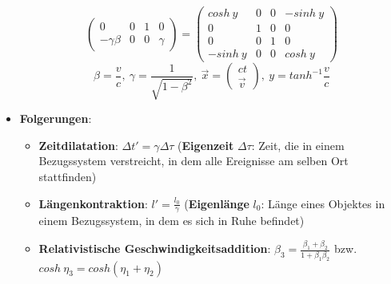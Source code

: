 \begin{itemize}
$$\begin{pmatrix}
			0 & 0 & 1 & 0\\
			-\gamma\beta & 0 & 0 & \gamma
		\end{pmatrix}
		=
		\begin{pmatrix}
			cosh\ y & 0 & 0 & -sinh\ y\\
			0 & 1 & 0 & 0\\
			0 & 0 & 1 & 0\\
			-sinh\ y & 0 & 0 & cosh\ y
		\end{pmatrix}
	$$
	$$
			\beta = \frac{v}{c},\ \gamma = \frac{1}{\sqrt{1 - \beta^2}},\ \vec{x} = \begin{pmatrix}ct\\\vec{v}\end{pmatrix},\ y = tanh^{-1}\frac{v}{c}
	$$
	\item \textbf{Folgerungen}:
	\begin{itemize}
		\item \textbf{Zeitdilatation}: $\Delta t' = \gamma\Delta\tau$ (\textbf{Eigenzeit} $\Delta\tau$: Zeit, die in einem Bezugssystem verstreicht, in dem alle Ereignisse am selben Ort stattfinden)
		\item \textbf{Längenkontraktion}: $l' = \frac{l_0}{\gamma}$ (\textbf{Eigenlänge} $l_0$: Länge eines Objektes in einem Bezugssystem, in dem es sich in Ruhe befindet)
		\item \textbf{Relativistische Geschwindigkeitsaddition}: $\beta_3 = \frac{\beta_1 + \beta_2}{1 + \beta_1\beta_2}$ bzw. $cosh\ \eta_3 = cosh(\eta_1 + \eta_2)$
	\end{itemize}
\end{itemize}